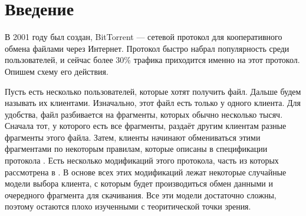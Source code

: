 \documentclass{matmex-diploma-custom}
\theoremstyle{named}
\begin{document}
\maketitle
	
\renewcommand{\contentsname}{Оглавление}
\tableofcontents
\newpage

\section*{Введение}
В 2001 году был создан, BitTorrent --- сетевой протокол для кооперативного обмена файлами через Интернет.
Протокол быстро набрал популярность среди пользователей, и сейчас более 30\% трафика приходится именно на этот протокол.
Опишем схему его действия.

Пусть есть несколько пользователей, которые хотят получить файл. Дальше будем называть их клиентами.
Изначально, этот файл есть только у одного клиента. 
Для удобства, файл разбивается на фрагменты, которых обычно несколько тысяч.
Сначала тот, у которого есть все фрагменты, раздаёт другим клиентам разные фрагменты этого файла.
Затем, клиенты начинают обмениваться этими фрагментами по некоторым правилам, 
которые описаны в спецификации протокола \cite{spec}.
Есть несколько модификаций этого протокола, часть из которых рассмотрена в \cite{cool}.
В основе всех этих модификаций лежат некоторые случайные модели выбора клиента, с которым будет производиться обмен данными 
и очередного фрагмента для скачивания. Все эти модели достаточно сложны, поэтому остаются плохо изученными с теоритической точки зрения.
\end{document}
